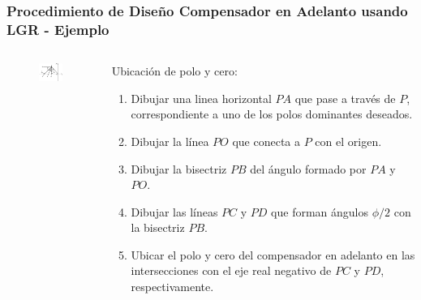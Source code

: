 \documentclass[aspectratio=169,handout]{beamer}
\theoremstyle{definition}
\theoremstyle{plain}
\theoremstyle{remark}
\begin{document}
\begin{frame}[<+->]\frametitle{Procedimiento de Diseño Compensador en Adelanto usando LGR - Ejemplo}
\vspace*{3mm}
\begin{columns}
	\begin{column}{0.3\textwidth}
	\begin{figure}
		\includegraphics[width=4cm]{images/ejemplo1_poloycero.eps}
	\end{figure}
	\end{column}
	\begin{column}{0.7\textwidth}
		Ubicación de polo y cero:
		\begin{enumerate}
			\item Dibujar una linea horizontal $PA$ que pase a través de $P$, correspondiente a uno de los polos dominantes deseados.
			\item Dibujar la línea $PO$ que conecta a $P$ con el origen.
			\item Dibujar la bisectriz $PB$ del ángulo formado por $PA$ y $PO$.
			\item Dibujar las líneas $PC$ y $PD$ que forman ángulos $\phi/2$ con la bisectriz $PB$.
			\item Ubicar el polo y cero del compensador en adelanto en las intersecciones con el eje real negativo de $PC$ y $PD$, respectivamente.
		\end{enumerate}
	\end{column}
\end{columns}
\end{frame}
\end{document}
